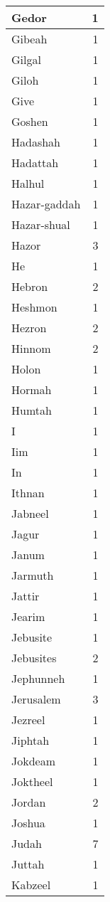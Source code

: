 \begin{center}
\begin{longtable}{l|r}
Gedor & 1\\ \hline 
Gibeah & 1\\ \hline 
Gilgal & 1\\ \hline 
Giloh & 1\\ \hline 
Give & 1\\ \hline 
Goshen & 1\\ \hline 
Hadashah & 1\\ \hline 
Hadattah & 1\\ \hline 
Halhul & 1\\ \hline 
Hazar-gaddah & 1\\ \hline 
Hazar-shual & 1\\ \hline 
Hazor & 3\\ \hline 
He & 1\\ \hline 
Hebron & 2\\ \hline 
Heshmon & 1\\ \hline 
Hezron & 2\\ \hline 
Hinnom & 2\\ \hline 
Holon & 1\\ \hline 
Hormah & 1\\ \hline 
Humtah & 1\\ \hline 
I & 1\\ \hline 
Iim & 1\\ \hline 
In & 1\\ \hline 
Ithnan & 1\\ \hline 
Jabneel & 1\\ \hline 
Jagur & 1\\ \hline 
Janum & 1\\ \hline 
Jarmuth & 1\\ \hline 
Jattir & 1\\ \hline 
Jearim & 1\\ \hline 
Jebusite & 1\\ \hline 
Jebusites & 2\\ \hline 
Jephunneh & 1\\ \hline 
Jerusalem & 3\\ \hline 
Jezreel & 1\\ \hline 
Jiphtah & 1\\ \hline 
Jokdeam & 1\\ \hline 
Joktheel & 1\\ \hline 
Jordan & 2\\ \hline 
Joshua & 1\\ \hline 
Judah & 7\\ \hline 
Juttah & 1\\ \hline 
Kabzeel & 1\\ \hline 

\end{longtable}
\end{center}
